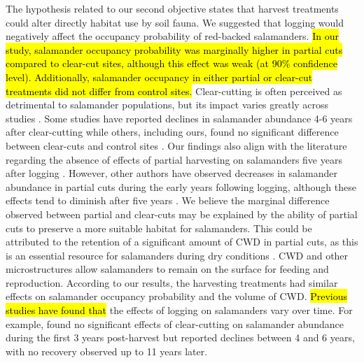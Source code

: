 The hypothesis related to our second objective states that harvest treatments could alter directly habitat use by soil fauna. 
We suggested that logging would negatively affect the occupancy probability of red-backed salamanders. 
\hl{In our study, salamander occupancy probability was marginally higher in partial cuts compared to clear-cut sites, although this effect was weak (at 90\% confidence level). 
Additionally, salamander occupancy in either partial or clear-cut treatments did not differ from control sites.}
Clear-cutting is often perceived as detrimental to salamander populations, but its impact varies greatly across studies \citep{Hocking2013Effectsexperimental,Chaudhary2016Impactforest}. 
Some studies have reported declines in salamander abundance 4-6 years after clear-cutting \citep{Petranka1993Effectstimber,Herbeck1999PlethodontidSalamander,Grialou2000effectsforest,Macneil2014Effectstimber}  
while others, including ours, found no significant difference between clear-cuts and control sites \citep{Renken2004EffectsForest,Mazerolle2021Woodlandsalamander}. 
Our findings also align with the literature regarding the absence of effects of partial harvesting on salamanders five years after logging \citep{McKenny2006Effectsstructural,Mazerolle2021Woodlandsalamander,Ochs2022Responseterrestrial}. 
However, other authors have observed decreases in salamander abundance in partial cuts during the early years following logging, although these effects tend to diminish after five years \citep{Harpole1999Effectsseven,Knapp2003Initialeffects,Morneault2004effectshelterwood}.  
We believe the marginal difference observed between partial and clear-cuts may be explained by the ability of partial cuts to preserve a more suitable habitat for salamanders. 
This could be attributed to the retention of a significant amount of CWD in partial cuts, as this is an essential resource for salamanders during dry conditions \citep{Nolet2018Comparingeffects,Peterman2014Spatialvariation,Achat2015Quantifyingconsequences,Peele2017Effectswoody}.  
CWD and other microstructures allow salamanders to remain on the surface for feeding and reproduction. 
According to our results, the harvesting treatments had similar effects on salamander occupancy probability and the volume of CWD. 
\hl{Previous studies have found that} the effects of logging on salamanders vary over time. 
For example, \cite{Ochs2022Responseterrestrial} found no significant effects of clear-cutting on salamander abundance during the first 3 years post-harvest but reported declines between 4 and 6 years, with no recovery observed up to 11 years later. 
